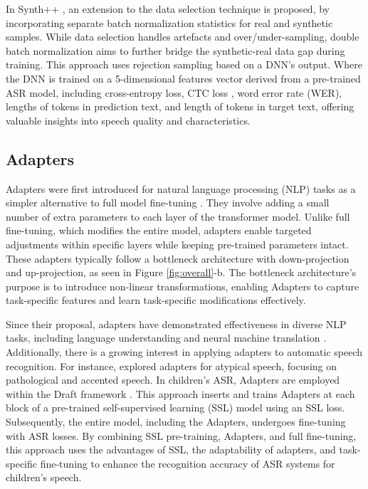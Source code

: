 In Synth++ \cite{hu2022synt++}, an extension to the data selection technique is proposed, by incorporating separate batch normalization statistics for real and synthetic samples. While data selection handles artefacts and over/under-sampling, double batch normalization aims to further bridge the synthetic-real data gap during training. This approach uses rejection sampling based on a DNN's output. Where the DNN is trained on a 5-dimensional features vector derived from a pre-trained ASR model, including cross-entropy loss, CTC loss \cite{CTC}, word error rate (WER), lengths of tokens in prediction text, and length of tokens in target text, offering valuable insights into speech quality and characteristics.
\subsection{Adapters}
Adapters were first introduced for natural language processing (NLP) tasks as a simpler alternative to full model fine-tuning \cite{houlsby}. They involve adding a small number of extra parameters to each layer of the transformer model. Unlike full fine-tuning, which modifies the entire model, adapters enable targeted adjustments within specific layers while keeping pre-trained parameters intact. These adapters typically follow a bottleneck architecture with down-projection and up-projection, as seen in Figure \ref{fig:overall}-b. The bottleneck architecture's purpose is to introduce non-linear transformations, enabling Adapters to capture task-specific features and learn task-specific modifications effectively.

Since their proposal, adapters have demonstrated effectiveness in diverse NLP tasks, including language understanding and neural machine translation \cite{philip2020monolingual}. Additionally, there is a growing interest in applying adapters to automatic speech recognition. For instance, \cite{tomanek2021residual} explored adapters for atypical speech, focusing on pathological and accented speech.
In children's ASR, Adapters are employed within the Draft framework \cite{fan2022draft}. This approach inserts and trains Adapters at each block of a pre-trained self-supervised learning (SSL) model using an SSL loss. Subsequently, the entire model, including the Adapters, undergoes fine-tuning with ASR losses. By combining SSL pre-training, Adapters, and full fine-tuning, this approach uses the advantages of SSL, the adaptability of adapters, and task-specific fine-tuning to enhance the recognition accuracy of ASR systems for children's speech.

